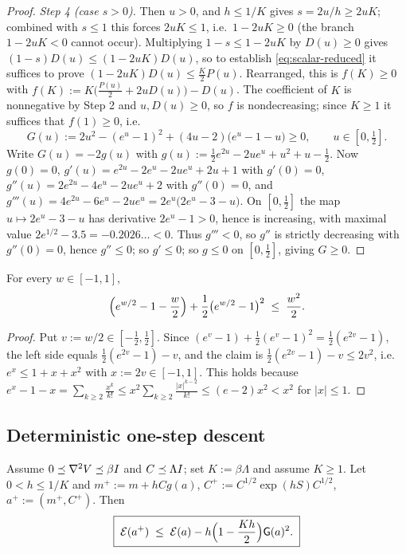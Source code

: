 \begin{proof}
\emph{Step 4 (case $s>0$).} Then $u>0$, and $h\leq1/K$ gives $s=2u/h\geq2uK$; combined with $s\leq1$
this forces $2uK\leq1$, i.e.\ $1-2uK\geq0$ (the branch $1-2uK<0$ cannot occur). Multiplying
$1-s\leq1-2uK$ by $D(u)\geq0$ gives $(1-s)D(u)\leq(1-2uK)D(u)$, so to establish
\eqref{eq:scalar-reduced} it suffices to prove
$(1-2uK)D(u)\leq\tfrac K2P(u)$. Rearranged, this is $f(K)\geq0$ with
$f(K):=K\bigl(\tfrac{P(u)}2+2uD(u)\bigr)-D(u)$. The coefficient of $K$ is nonnegative by Step 2
and $u,D(u)\geq0$, so $f$ is nondecreasing; since $K\geq1$ it suffices that $f(1)\geq0$, i.e.
\[
    G(u):=2u^2-(e^u-1)^2+(4u-2)\bigl(e^u-1-u\bigr)\geq0,\qquad u\in[0,\tfrac12].
\]
Write $G(u)=-2g(u)$ with $g(u):=\tfrac12e^{2u}-2ue^{u}+u^2+u-\tfrac12$. Now $g(0)=0$,
$g'(u)=e^{2u}-2e^u-2ue^u+2u+1$ with $g'(0)=0$, $g''(u)=2e^{2u}-4e^u-2ue^u+2$ with $g''(0)=0$, and
$g'''(u)=4e^{2u}-6e^u-2ue^u=2e^u\bigl(2e^u-3-u\bigr)$.
On $[0,\tfrac12]$ the map $u\mapsto2e^u-3-u$ has derivative $2e^u-1>0$, hence is increasing, with
maximal value $2e^{1/2}-3.5=-0.2026\ldots<0$. Thus $g'''<0$, so $g''$ is strictly decreasing with
$g''(0)=0$, hence $g''\leq0$; so $g'\leq0$; so $g\leq0$ on $[0,\tfrac12]$, giving $G\geq0$.
\end{proof}

\begin{lemma}
\label{lem:scalar-stoch}
For every $w\in[-1,1]$,
\begin{equation}
\label{eq:scalar-stoch}
    \Bigl(e^{w/2}-1-\frac w2\Bigr)+\frac12\bigl(e^{w/2}-1\bigr)^2\;\leq\;\frac{w^2}2 .
\end{equation}
\end{lemma}

\begin{proof}
Put $v:=w/2\in[-\tfrac12,\tfrac12]$. Since
$(e^v-1)+\tfrac12(e^v-1)^2=\tfrac12(e^{2v}-1)$, the left side equals $\tfrac12(e^{2v}-1)-v$, and
the claim is $\tfrac12(e^{2v}-1)-v\leq2v^2$, i.e.\ $e^x\leq1+x+x^2$ with $x:=2v\in[-1,1]$. This
holds because
$e^x-1-x=\sum_{k\geq2}\tfrac{x^k}{k!}\leq x^2\sum_{k\geq2}\tfrac{|x|^{k-2}}{k!}\leq(e-2)x^2<x^2$
for $|x|\leq1$.
\end{proof}

\subsection{Deterministic one-step descent}

\begin{lemma}
\label{lem:det-descent}
Assume $0\preceq\nabla^2V\preceq\beta I$ and $C\preceq\Lambda I$; set $K:=\beta\Lambda$ and
assume $K\geq1$. Let $0<h\leq1/K$ and
$m^+:=m+hCg(a)$, $C^+:=C^{1/2}\exp(hS)C^{1/2}$, $a^+:=(m^+,C^+)$. Then
\begin{equation}
\label{eq:det-descent}
    \boxed{\;
    \mathcal{E}(a^+)\;\leq\;\mathcal{E}(a)-h\Bigl(1-\frac{Kh}2\Bigr)\mathsf{G}(a)^2 .
    \;}
\end{equation}
\end{lemma}

